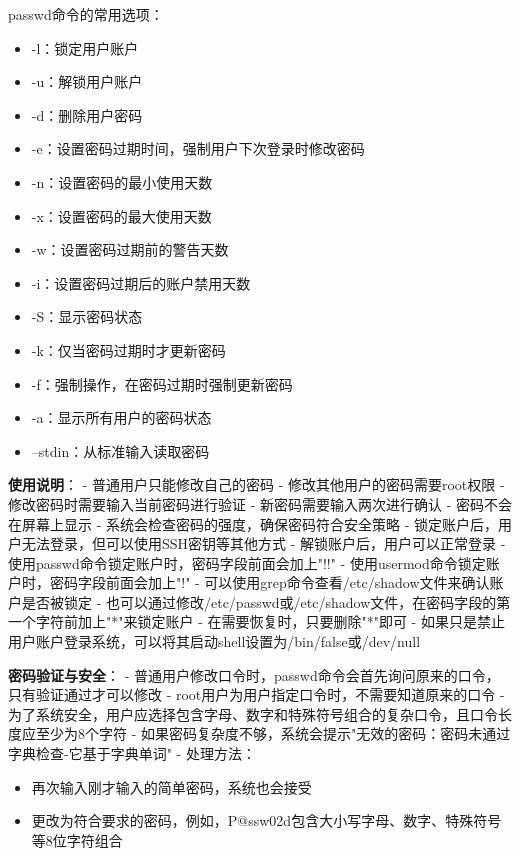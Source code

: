 \documentclass[12pt,UTF8]{ctexbook}
\begin{document}
passwd命令的常用选项：
\begin{itemize}
    \item -l：锁定用户账户
    \item -u：解锁用户账户
    \item -d：删除用户密码
    \item -e：设置密码过期时间，强制用户下次登录时修改密码
    \item -n：设置密码的最小使用天数
    \item -x：设置密码的最大使用天数
    \item -w：设置密码过期前的警告天数
    \item -i：设置密码过期后的账户禁用天数
    \item -S：显示密码状态
    \item -k：仅当密码过期时才更新密码
    \item -f：强制操作，在密码过期时强制更新密码
    \item -a：显示所有用户的密码状态
    \item --stdin：从标准输入读取密码
\end{itemize}

\textbf{使用说明}：
- 普通用户只能修改自己的密码
- 修改其他用户的密码需要root权限
- 修改密码时需要输入当前密码进行验证
- 新密码需要输入两次进行确认
- 密码不会在屏幕上显示
- 系统会检查密码的强度，确保密码符合安全策略
- 锁定账户后，用户无法登录，但可以使用SSH密钥等其他方式
- 解锁账户后，用户可以正常登录
- 使用passwd命令锁定账户时，密码字段前面会加上"!!"
- 使用usermod命令锁定账户时，密码字段前面会加上"!"
- 可以使用grep命令查看/etc/shadow文件来确认账户是否被锁定
- 也可以通过修改/etc/passwd或/etc/shadow文件，在密码字段的第一个字符前加上"*"来锁定账户
- 在需要恢复时，只要删除"*"即可
- 如果只是禁止用户账户登录系统，可以将其启动shell设置为/bin/false或/dev/null

\textbf{密码验证与安全}：
- 普通用户修改口令时，passwd命令会首先询问原来的口令，只有验证通过才可以修改
- root用户为用户指定口令时，不需要知道原来的口令
- 为了系统安全，用户应选择包含字母、数字和特殊符号组合的复杂口令，且口令长度应至少为8个字符
- 如果密码复杂度不够，系统会提示"无效的密码：密码未通过字典检查-它基于字典单词"
- 处理方法：
  \begin{itemize}
    \item 再次输入刚才输入的简单密码，系统也会接受
    \item 更改为符合要求的密码，例如，P@ssw02d包含大小写字母、数字、特殊符号等8位字符组合
  \end{itemize}
\end{document}
